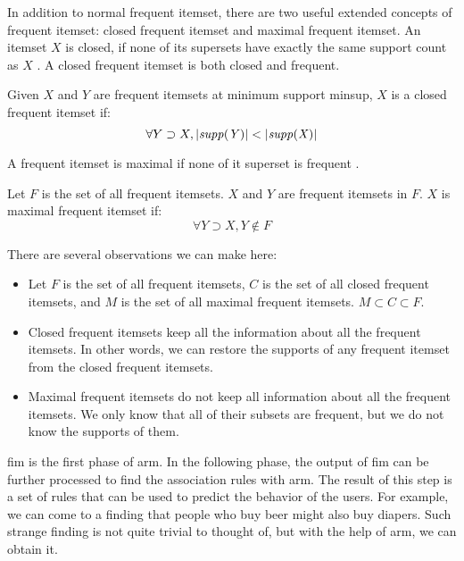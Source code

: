 In addition to normal frequent itemset, there are two useful extended concepts of frequent itemset: closed frequent itemset and maximal frequent itemset.
An itemset $X$ is closed, if none of its supersets have exactly the same support count as $X$ \cite{Aggarwal15}.
A closed frequent itemset is both closed and frequent.
\begin{definition}
    Given $X$ and $Y$ are frequent itemsets at minimum support minsup, $X$ is a closed frequent itemset if:
    \begin{equation}
        \forall Y \supset X, \lvert \mathit{supp({Y})} \rvert < \lvert \mathit{supp({X})} \rvert
    \end{equation}
\end{definition}

A frequent itemset is maximal if none of it superset is frequent \cite{Aggarwal15}.

\begin{definition}
    Let $F$ is the set of all frequent itemsets. $X$ and $Y$ are frequent itemsets in $F$. $X$ is maximal frequent itemset if:
    \begin{equation}
        \forall Y \supset X, Y \notin F
    \end{equation}
\end{definition}

There are several observations we can make here:
\begin{itemize}
    \item Let $F$ is the set of all frequent itemsets, $C$ is the set of all closed frequent itemsets, and $M$ is the set of all maximal frequent itemsets. $M \subset C \subset F$.
    \item Closed frequent itemsets keep all the information about all the frequent itemsets. In other words, we can restore the supports of any frequent itemset from the closed frequent itemsets.
    \item Maximal frequent itemsets do not keep all information about all the frequent itemsets. We only know that all of their subsets are frequent, but we do not know the supports of them.
\end{itemize}

\label{sub:association_rule_mining}
\Ac{fim} is the first phase of \ac{arm}.
In the following phase, the output of \ac{fim} can be further processed to find the association rules with \acl{arm}.
The result of this step is a set of rules that can be used to predict the behavior of the users.
For example, we can come to a finding that people who buy beer might also buy diapers.
Such strange finding is not quite trivial to thought of, but with the help of \acl{arm}, we can obtain it.


